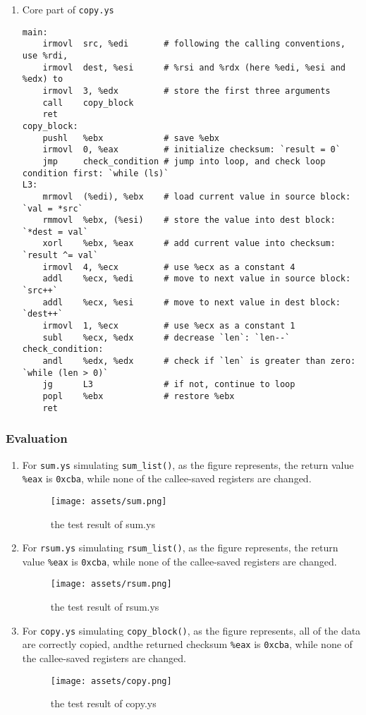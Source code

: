 \documentclass{article}
\begin{document}
\begin{enumerate}
  \item Core part of \verb|copy.ys|
\begin{lstlisting}
main:
    irmovl  src, %edi       # following the calling conventions, use %rdi,
    irmovl  dest, %esi      # %rsi and %rdx (here %edi, %esi and %edx) to
    irmovl  3, %edx         # store the first three arguments
    call    copy_block
    ret
copy_block:
    pushl   %ebx            # save %ebx
    irmovl  0, %eax         # initialize checksum: `result = 0`
    jmp     check_condition # jump into loop, and check loop condition first: `while (ls)`
L3:
    mrmovl  (%edi), %ebx    # load current value in source block: `val = *src`
    rmmovl  %ebx, (%esi)    # store the value into dest block: `*dest = val`
    xorl    %ebx, %eax      # add current value into checksum: `result ^= val`
    irmovl  4, %ecx         # use %ecx as a constant 4
    addl    %ecx, %edi      # move to next value in source block: `src++`
    addl    %ecx, %esi      # move to next value in dest block: `dest++`
    irmovl  1, %ecx         # use %ecx as a constant 1
    subl    %ecx, %edx      # decrease `len`: `len--`
check_condition:
    andl    %edx, %edx      # check if `len` is greater than zero: `while (len > 0)`
    jg      L3              # if not, continue to loop
    popl    %ebx            # restore %ebx
    ret
\end{lstlisting}

\end{enumerate}

\subsubsection{Evaluation}

\begin{enumerate}
  \item For \verb|sum.ys| simulating \verb|sum_list()|, as the figure represents, the return value \verb|%eax| is \verb|0xcba|, while none of the callee-saved registers are changed.
  \begin{figure}[h]
    \centering
    \texttt{[image: assets/sum.png]}
    \caption{the test result of sum.ys}
  \end{figure}

  \item For \verb|rsum.ys| simulating \verb|rsum_list()|, as the figure represents, the return value \verb|%eax| is \verb|0xcba|, while none of the callee-saved registers are changed.
  \begin{figure}[h]
    \centering
    \texttt{[image: assets/rsum.png]}
    \caption{the test result of rsum.ys}
  \end{figure}

  \item For \verb|copy.ys| simulating \verb|copy_block()|, as the figure represents, all of the data are correctly copied, andthe returned checksum \verb|%eax| is \verb|0xcba|, while none of the callee-saved registers are changed.
  \begin{figure}[h]
    \centering
    \texttt{[image: assets/copy.png]}
    \caption{the test result of copy.ys}
  \end{figure}
\end{enumerate}
\end{document}
